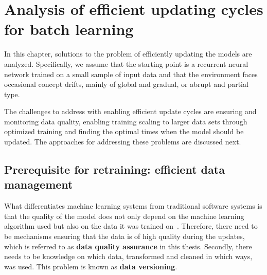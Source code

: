 

\chapter{Analysis of efficient updating cycles for batch learning}

In this chapter, solutions to the problem of efficiently updating the models are analyzed. Specifically, we assume that the starting point is a recurrent neural network trained on a small sample of input data and that the environment faces occasional concept drifts, mainly of global and gradual, or abrupt and partial type.

The challenges to address with enabling efficient update cycles are ensuring and monitoring data quality, enabling training scaling to larger data sets through optimized training and finding the optimal times when the model should be updated. The approaches for addressing these problems are discussed next.

\section[Prerequisite for retraining: efficient data management]{Prerequisite for retraining: efficient data \\management}

What differentiates machine learning systems from traditional software systems is that the quality of the model does not only depend on the machine learning algorithm used but also on the data it was trained on~\cite{polyzotisDataLifecycleChallenges2018}. Therefore, there need to be mechanisms ensuring that the data is of high quality during the updates, which is referred to as \textbf{data quality assurance} in this thesis. Secondly, there needs to be knowledge on which data, transformed and cleaned in which ways, was used. This problem is known as \textbf{data versioning}.

